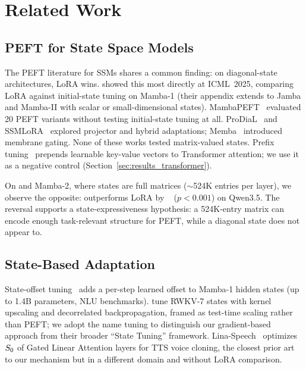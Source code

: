 \documentclass{article}
\begin{document}
\section{Related Work}
\label{sec:related}

\subsection{PEFT for State Space Models}
\label{sec:rel_peft_ssm}

The PEFT literature for SSMs shares a common finding: on diagonal-state architectures, LoRA wins.
\citet{galim_peft_ssm} showed this most directly at ICML~2025, comparing LoRA against initial-state tuning on Mamba-1 (their appendix extends to Jamba and Mamba-II with scalar or small-dimensional states).
MambaPEFT~\cite{mamba_peft} evaluated 20 PEFT variants without testing initial-state tuning at all.
ProDiaL~\cite{prodial} and SSMLoRA~\cite{ssmlora} explored projector and hybrid adaptations; Memba~\cite{memba} introduced membrane gating.
None of these works tested matrix-valued states.
Prefix tuning~\cite{prefix_tuning} prepends learnable key-value vectors to Transformer attention; we use it as a negative control (Section~\ref{sec:results_transformer}).

On \gdn and Mamba-2, where states are full matrices (${\sim}$524K entries per layer), we observe the opposite: \method outperforms LoRA by \loragap~\pp{} ($p < 0.001$) on Qwen3.5.
The reversal supports a state-expressiveness hypothesis: a 524K-entry matrix can encode enough task-relevant structure for PEFT, while a diagonal state does not appear to.

\subsection{State-Based Adaptation}
\label{sec:rel_state}

State-offset tuning~\cite{state_offset} adds a per-step learned offset to Mamba-1 hidden states (up to 1.4B parameters, NLU benchmarks).
\citet{rwkv_state_tuning} tune RWKV-7 states with kernel upscaling and decorrelated backpropagation, framed as test-time scaling rather than PEFT; we adopt the name \methodshort tuning to distinguish our gradient-based approach from their broader ``State Tuning'' framework.
Lina-Speech~\cite{lina_speech} optimizes $S_0$ of Gated Linear Attention layers for TTS voice cloning, the closest prior art to our mechanism but in a different domain and without LoRA comparison.
\end{document}
